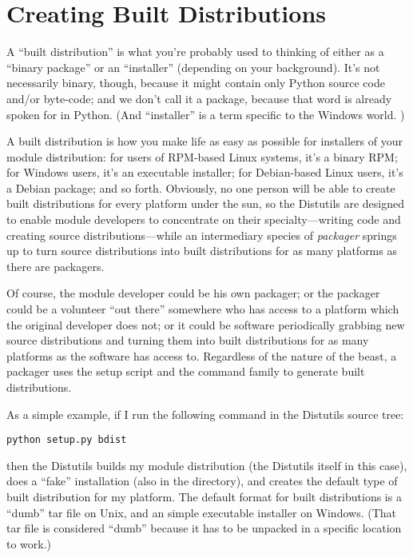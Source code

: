 \documentclass{howto}
\begin{document}
\section{Creating Built Distributions}
\label{built-dist}

A ``built distribution'' is what you're probably used to thinking of
either as a ``binary package'' or an ``installer'' (depending on your
background).  It's not necessarily binary, though, because it might
contain only Python source code and/or byte-code; and we don't call it a
package, because that word is already spoken for in Python.  (And
``installer'' is a term specific to the Windows world.  )

A built distribution is how you make life as easy as possible for
installers of your module distribution: for users of RPM-based Linux
systems, it's a binary RPM; for Windows users, it's an executable
installer; for Debian-based Linux users, it's a Debian package; and so
forth.  Obviously, no one person will be able to create built
distributions for every platform under the sun, so the Distutils are
designed to enable module developers to concentrate on their
specialty---writing code and creating source distributions---while an
intermediary species of \emph{packager} springs up to turn source
distributions into built distributions for as many platforms as there
are packagers.

Of course, the module developer could be his own packager; or the
packager could be a volunteer ``out there'' somewhere who has access to
a platform which the original developer does not; or it could be
software periodically grabbing new source distributions and turning them
into built distributions for as many platforms as the software has
access to.  Regardless of the nature of the beast, a packager uses the
setup script and the  command family to generate built
distributions.

As a simple example, if I run the following command in the Distutils
source tree:
\begin{verbatim}
python setup.py bdist
\end{verbatim}
then the Distutils builds my module distribution (the Distutils itself
in this case), does a ``fake'' installation (also in the 
directory), and creates the default type of built distribution for my
platform.  The default format for built distributions is a ``dumb'' tar
file on Unix, and an simple executable installer on Windows.  (That tar
file is considered ``dumb'' because it has to be unpacked in a specific
location to work.)
\end{document}
